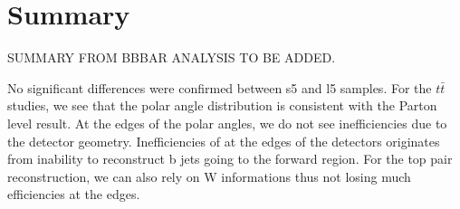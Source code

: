\documentclass[preprint]{elsarticle}
\begin{document}


\section{Summary}


SUMMARY FROM BBBAR ANALYSIS TO BE ADDED.

No significant differences were confirmed between s5 and l5 samples. For the $t\bar{t}$ studies, we see that the polar angle distribution is consistent with the Parton level result. At the edges of the polar angles, we do not see inefficiencies due to the detector geometry. Inefficiencies of at the edges of the detectors originates from inability to reconstruct b jets going to the forward region. For the top pair reconstruction, we can also rely on W informations thus not losing much efficiencies at the edges.
\end{document}
